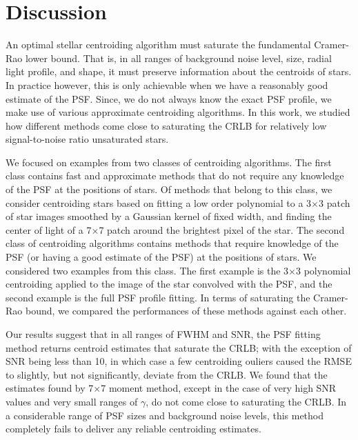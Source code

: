 \documentclass[12pt, preprint]{aastex}
\begin{document}
\section{Discussion}\label{sec:discussion}

An optimal stellar centroiding algorithm must saturate the fundamental Cramer-Rao lower 
bound. That is, in all ranges of background noise level, size, radial light profile,
and shape, it must preserve information about the centroids of stars. In practice however,
this is only achievable when we have a reasonably good estimate of the PSF. Since, we do not always 
know the exact PSF profile, we make use of various approximate centroiding algorithms. In this work, we
studied how different methods come close to saturating the CRLB for relatively low signal-to-noise ratio
unsaturated stars.
 
We focused on examples from two classes of centroiding algorithms. The first class contains fast and approximate
methods that do not require any knowledge of the PSF at the positions of stars. Of methods that belong to this class,
we consider centroiding stars based on fitting a low order
polynomial to a 3$\times$3 patch of star images smoothed by a Gaussian kernel of fixed width, and finding the center of light 
of a 7$\times$7 patch around the brightest pixel of the star.
The second class of centroiding algorithms contains methods that require knowledge of the PSF (or having a good estimate
of the PSF) at the positions of stars. We considered two examples from this class. The first example
is the 3$\times$3 polynomial centroiding applied to the image of the star convolved with the PSF, and the
second example is the full PSF profile fitting. In terms of saturating the Cramer-Rao bound, we compared 
the performances of these methods against each other.

 
Our results suggest that in all ranges of FWHM and SNR, the PSF fitting method returns 
centroid estimates that saturate the CRLB; with the exception of SNR being less than 10, 
in which case a few centroiding ouliers caused the RMSE to slightly, but not significantly, deviate
from the CRLB. We found that the estimates found by 7$\times$7 moment method, except in the case of
very high SNR values and very small ranges of $\gamma$, do not come close to
saturating the CRLB. In a considerable range of PSF sizes and background noise levels, 
this method completely fails to deliver any reliable centroiding estimates.
 
\end{document}
